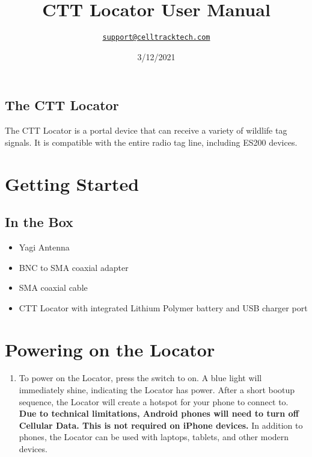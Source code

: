 \documentclass[
]{article}
\title{CTT Locator User Manual}
\author{\href{mailto:support@celltracktech.com}{\nolinkurl{support@celltracktech.com}}}
\date{3/12/2021}
\providecommand{\tightlist}{%
  \setlength{\itemsep}{0pt}\setlength{\parskip}{0pt}}
\begin{document}
\maketitle

{
\setcounter{tocdepth}{2}
\tableofcontents
}
\hypertarget{the-ctt-locator}{%
\subsection{The CTT Locator}\label{the-ctt-locator}}

The CTT Locator is a portal device that can receive a variety of
wildlife tag signals. It is compatible with the entire radio tag line,
including ES200 devices.

\hypertarget{getting-started}{%
\section{Getting Started}\label{getting-started}}

\hypertarget{in-the-box}{%
\subsection{In the Box}\label{in-the-box}}

\begin{itemize}
\tightlist
\item
  Yagi Antenna
\item
  BNC to SMA coaxial adapter
\item
  SMA coaxial cable
\item
  CTT Locator with integrated Lithium Polymer battery and USB charger
  port
\end{itemize}

\hypertarget{powering-on-the-locator}{%
\section{Powering on the Locator}\label{powering-on-the-locator}}

\begin{enumerate}
\def\labelenumi{\arabic{enumi}.}
\tightlist
\item
  To power on the Locator, press the switch to on. A blue light will
  immediately shine, indicating the Locator has power. After a short
  bootup sequence, the Locator will create a hotspot for your phone to
  connect to. \textbf{Due to technical limitations, Android phones will
  need to turn off Cellular Data. This is not required on iPhone
  devices.} In addition to phones, the Locator can be used with laptops,
  tablets, and other modern devices.
\end{enumerate}
\end{document}
